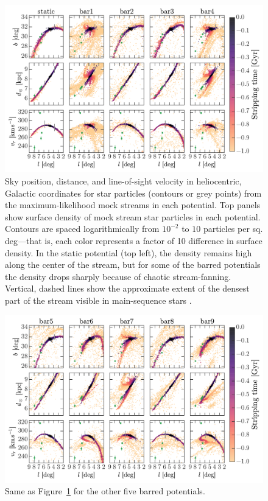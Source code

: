 \documentclass[numberedappendix]{emulateapj}
\begin{document}
\begin{figure}[p]
\begin{center}
\includegraphics[width=\textwidth]{figures/mockstream0}
\caption{ Sky position, distance, and line-of-sight velocity in heliocentric, Galactic coordinates for star particles (contours or grey points) from the maximum-likelihood mock streams in each potential. Top panels show surface density of mock stream star particles in each potential. Contours are spaced logarithmically from $10^{-2}$ to $10$ particles per sq. deg---that is, each color represents a factor of 10 difference in surface density. In the static potential (top left), the density remains high along the center of the stream, but for some of the barred potentials the density drops sharply because of chaotic stream-fanning. Vertical, dashed lines show the approximate extent of the densest part of the stream visible in main-sequence stars \citep[the segment originally detected in ][]{bernard14}.}
\label{fig:mockstream0}
\end{center}
\end{figure}


\begin{figure}[p]
\begin{center}
\includegraphics[width=\textwidth]{figures/mockstream1}
\caption{ Same as Figure~\ref{fig:mockstream0} for the other five barred potentials. }
\label{fig:mockstream1}
\end{center}
\end{figure}
\end{document}

